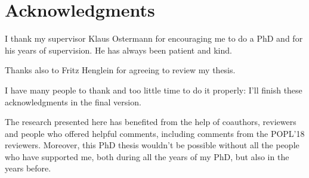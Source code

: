 
\chapter{Acknowledgments}
I thank my supervisor Klaus Ostermann for encouraging me to do a PhD
and for his years of supervision. He has always been patient and kind.

Thanks also to Fritz Henglein for agreeing to review my thesis.

I have many people to thank and too little time to do it properly: I'll finish
these acknowledgments in the final version.

The research presented here has benefited from the help of coauthors,
reviewers and people who offered helpful comments, including comments from
the POPL'18 reviewers.
Moreover, this PhD thesis wouldn't be possible without all the people who have
supported me, both during all the years of my PhD, but also in the years before.



